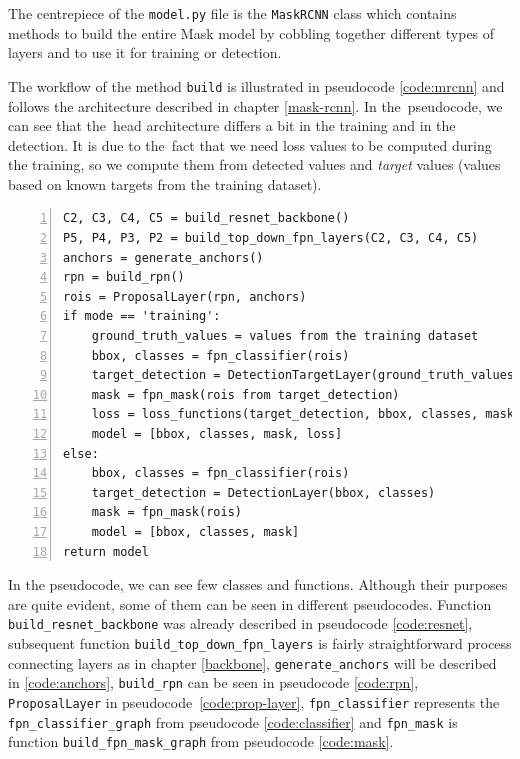 The centrepiece of the \verb|model.py| file is the \verb|MaskRCNN| class which 
contains methods to build the entire Mask  model by cobbling together 
different types of layers and to use it for training or detection.

The workflow of the method \verb|build| is illustrated in pseudocode 
\ref{code:mrcnn} and follows the architecture described in chapter 
\ref{mask-rcnn}. In the~pseudocode, we can see that the~head architecture 
differs a bit in the training and in the detection. It is due to the~fact that 
we need loss values to be computed during the training, so we compute them from 
detected values and \textit{target} values (values based on known targets from 
the training dataset).

{\scriptsize
\begin{lstlisting}[style=python, caption={Mask R-CNN.build}, captionpos=b, 
label=code:mrcnn, deletekeywords={from},
backgroundcolor = \color{light-gray}, numbers=left, breaklines=true]
C2, C3, C4, C5 = build_resnet_backbone()
P5, P4, P3, P2 = build_top_down_fpn_layers(C2, C3, C4, C5)
anchors = generate_anchors()
rpn = build_rpn()
rois = ProposalLayer(rpn, anchors)
if mode == 'training':
    ground_truth_values = values from the training dataset
    bbox, classes = fpn_classifier(rois)
    target_detection = DetectionTargetLayer(ground_truth_values)
    mask = fpn_mask(rois from target_detection)
    loss = loss_functions(target_detection, bbox, classes, mask)
    model = [bbox, classes, mask, loss]
else:
    bbox, classes = fpn_classifier(rois)
    target_detection = DetectionLayer(bbox, classes)
    mask = fpn_mask(rois)
    model = [bbox, classes, mask]
return model
\end{lstlisting}}

In the pseudocode, we can see few classes and functions. Although their purposes are quite 
evident, some of them can be seen in different pseudocodes. Function
\verb|build_resnet_backbone| was already described in pseudocode \ref{code:resnet}, subsequent
func\-tion \verb|build_top_down_fpn_layers| is fairly straightforward process connecting 
layers as in chapter \ref{backbone}, \verb|generate_anchors| will be described 
in \ref{code:anchors}, \verb|build_rpn| can be seen in pseudocode 
\ref{code:rpn}, \verb|ProposalLayer| in pseudocode~\ref{code:prop-layer}, 
\verb|fpn_classifier| represents the \verb|fpn_classifier_graph| from pseudocode 
\ref{code:classifier} and \verb|fpn_mask| is function \verb|build_fpn_mask_graph| from 
pseudocode \ref{code:mask}.


